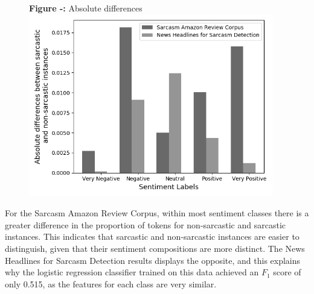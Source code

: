 \documentclass[12pt,a4paper]{article}
\begin{document}
\begin{minipage}{0.4\textwidth}
	\begin{figure}[H]
		\begin{center}
			\textbf{Figure -:} Absolute differences\\
			\includegraphics[width=0.95\textwidth]{Images/absolute_differences.png}
			\label{Sarcasm Amazon Review Corpus}
		\end{center}
	\end{figure}
\end{minipage} \hfill
\begin{minipage}{0.6\textwidth}
	For the Sarcasm Amazon Review Corpus, within most sentiment classes there is a greater difference in the proportion of tokens for non-sarcastic and sarcastic instances. This indicates that sarcastic and non-sarcastic instances are easier to distinguish, given that their sentiment compositions are more distinct. The News Headlines for Sarcasm Detection results displays the opposite, and this explains why the logistic regression classifier trained on this data achieved an $F_1$  score of only 0.515, as the features for each class are very similar.
\end{minipage}



\end{document}
